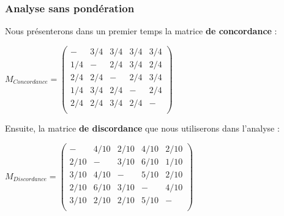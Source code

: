 \documentclass[a4paper, 11pt]{article}
\begin{document}
\subsubsection{Analyse sans pondération}
Nous présenterons dans un premier temps la matrice \textbf{de concordance} :
\begin{center}
$ M_{Concordance} =\begin{pmatrix}
-&3/4&3/4&3/4&3/4\\
1/4&-&2/4&3/4&2/4\\
2/4&2/4&-&2/4&3/4\\
1/4&3/4&2/4&-&2/4\\
2/4&2/4&3/4&2/4&-\\
\end{pmatrix} $\\
\end{center}
Ensuite, la matrice \textbf{de discordance} que nous utiliserons dans l'analyse :
\begin{center}
$ M_{Discordance} =\begin{pmatrix}
-&4/10&2/10&4/10&2/10\\
2/10&-&3/10&6/10&1/10\\
3/10&4/10&-&5/10&2/10\\
2/10&6/10&3/10&-&4/10\\
3/10&2/10&2/10&5/10&-\\
\end{pmatrix} $\\
\end{center}
\end{document}
